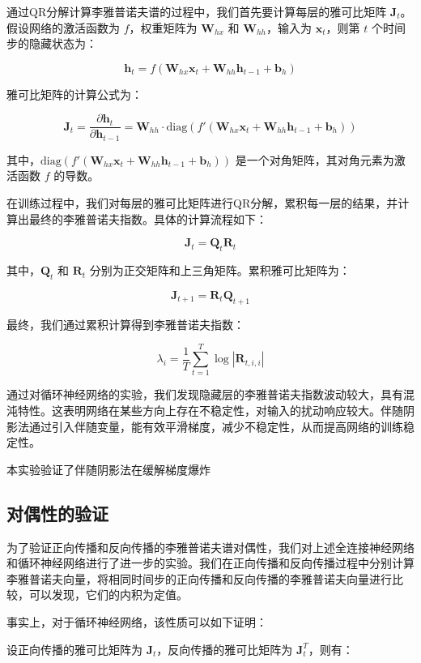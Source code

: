 通过QR分解计算李雅普诺夫谱的过程中，我们首先要计算每层的雅可比矩阵 \(\mathbf{J}_t\)。假设网络的激活函数为 \( f \)，权重矩阵为 \(\mathbf{W}_{hx}\) 和 \(\mathbf{W}_{hh}\)，输入为 \(\mathbf{x}_t\)，则第 \(t\) 个时间步的隐藏状态为：

\[
\mathbf{h}_t = f(\mathbf{W}_{hx} \mathbf{x}_t + \mathbf{W}_{hh} \mathbf{h}_{t-1} + \mathbf{b}_h)
\]

雅可比矩阵的计算公式为：

\[
\mathbf{J}_t = \frac{\partial \mathbf{h}_t}{\partial \mathbf{h}_{t-1}} = \mathbf{W}_{hh} \cdot \text{diag}(f'(\mathbf{W}_{hx} \mathbf{x}_t + \mathbf{W}_{hh} \mathbf{h}_{t-1} + \mathbf{b}_h))
\]

其中，\(\text{diag}(f'(\mathbf{W}_{hx} \mathbf{x}_t + \mathbf{W}_{hh} \mathbf{h}_{t-1} + \mathbf{b}_h))\) 是一个对角矩阵，其对角元素为激活函数 \(f\) 的导数。

在训练过程中，我们对每层的雅可比矩阵进行QR分解，累积每一层的结果，并计算出最终的李雅普诺夫指数。具体的计算流程如下：

\[
\mathbf{J}_t = \mathbf{Q}_t \mathbf{R}_t
\]

其中，\(\mathbf{Q}_t\) 和 \(\mathbf{R}_t\) 分别为正交矩阵和上三角矩阵。累积雅可比矩阵为：

\[
\mathbf{J}_{t+1} = \mathbf{R}_t \mathbf{Q}_{t+1}
\]

最终，我们通过累积计算得到李雅普诺夫指数：

\[
\lambda_i = \frac{1}{T} \sum_{t=1}^T \log |\mathbf{R}_{t,i,i}|
\]

通过对循环神经网络的实验，我们发现隐藏层的李雅普诺夫指数波动较大，具有混沌特性。这表明网络在某些方向上存在不稳定性，对输入的扰动响应较大。伴随阴影法通过引入伴随变量，能有效平滑梯度，减少不稳定性，从而提高网络的训练稳定性。

本实验验证了伴随阴影法在缓解梯度爆炸

\subsection{对偶性的验证}

为了验证正向传播和反向传播的李雅普诺夫谱对偶性，我们对上述全连接神经网络和循环神经网络进行了进一步的实验。我们在正向传播和反向传播过程中分别计算李雅普诺夫向量，将相同时间步的正向传播和反向传播的李雅普诺夫向量进行比较，可以发现，它们的内积为定值。

事实上，对于循环神经网络，该性质可以如下证明：

设正向传播的雅可比矩阵为 \(\mathbf{J}_t\)，反向传播的雅可比矩阵为 \(\mathbf{J}_t^T\)，则有：

